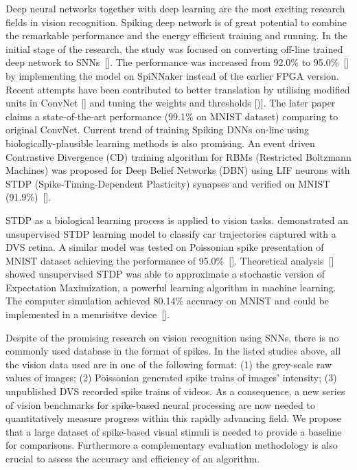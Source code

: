 Deep neural networks together with deep learning are the most exciting research fields in vision recognition.
Spiking deep network is of great potential to combine the remarkable performance and the energy efficient training and running.
In the initial stage of the research, the study was focused on converting off-line trained deep network to SNNs~[\cite{o2013real}].
The performance was increased from 92.0\% to 95.0\%~[\cite{Stromatias2015scalable}] by implementing the model on SpiNNaker instead of the earlier FPGA version.
Recent attempts have been contributed to better translation by utilising modified units in ConvNet [\cite{cao2015spiking}] and tuning the weights and thresholds [\cite{Diehl2015fast})].
The later paper claims a state-of-the-art performance (99.1\% on MNIST dataset) comparing to original ConvNet.
Current trend of training Spiking DNNs on-line using biologically-plausible learning methods is also promising.
An event driven Contrastive Divergence (CD) training algorithm for RBMs (Restricted Boltzmann Machines) was proposed for Deep Belief Networks (DBN) using LIF neurons with STDP (Spike-Timing-Dependent Plasticity) synapses and verified on MNIST (91.9\%)~[\cite{neftci2013event}].

STDP as a biological learning process is applied to vision tasks.
\cite{bichler2012extraction} demonstrated an unsupervised STDP learning model to classify car trajectories captured with a DVS retina. 
A similar model was tested on Poissonian spike presentation of MNIST dataset achieving the performance of 95.0\%~[\cite{Diehl2015unsupervised}].
Theoretical analysis~[\cite{nessler2013bayesian}] showed unsupervised STDP was able to approximate a stochastic version of Expectation Maximization, a powerful learning algorithm in machine learning.
The computer simulation achieved 80.14\% accuracy on MNIST and could be implemented in a memrisitve device~[\cite{bill2014compound}]. 

Despite of the promising research on vision recognition using SNNs, there is no commonly used database in the format of spikes.
In the listed studies above, all the vision data used are in one of the following format:
(1) the grey-scale raw values of images;
(2) Poissonian generated spike trains of images' intensity;
(3) unpublished DVS recorded spike trains of videos.
As a consequence, a new series of vision benchmarks for spike-based neural processing are now needed to quantitatively measure progress within this rapidly advancing field.
We propose that a large dataset of spike-based visual stimuli is needed to provide a baseline for comparisons.
Furthermore a complementary evaluation methodology is also crucial to assess the accuracy and efficiency of an algorithm.

